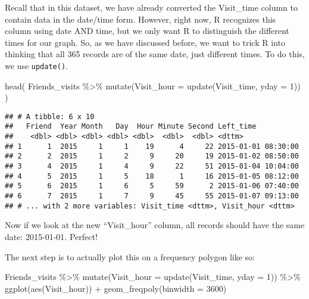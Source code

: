 \documentclass[
]{book}
\newenvironment{Shaded}{\begin{snugshade}}{\end{snugshade}}
\newcommand{\AttributeTok}[1]{\textcolor[rgb]{0.77,0.63,0.00}{#1}}
\newcommand{\DecValTok}[1]{\textcolor[rgb]{0.00,0.00,0.81}{#1}}
\newcommand{\FunctionTok}[1]{\textcolor[rgb]{0.00,0.00,0.00}{#1}}
\newcommand{\NormalTok}[1]{#1}
\newcommand{\SpecialCharTok}[1]{\textcolor[rgb]{0.00,0.00,0.00}{#1}}
\begin{document}
Recall that in this dataset, we have already converted the Visit\_time column to contain data in the date/time form. However, right now, R recognizes this column using date AND time, but we only want R to distinguish the different times for our graph. So, as we have discussed before, we want to trick R into thinking that all 365 records are of the same date, just different times. To do this, we use \texttt{update()}.

\begin{Shaded}
\begin{Highlighting}[]
\FunctionTok{head}\NormalTok{(}
\NormalTok{    Friends\_visits }\SpecialCharTok{\%\textgreater{}\%}
    \FunctionTok{mutate}\NormalTok{(}\AttributeTok{Visit\_hour =} \FunctionTok{update}\NormalTok{(Visit\_time, }\AttributeTok{yday =} \DecValTok{1}\NormalTok{))}
\NormalTok{    )}
\end{Highlighting}
\end{Shaded}

\begin{verbatim}
## # A tibble: 6 x 10
##   Friend  Year Month   Day  Hour Minute Second Left_time
##    <dbl> <dbl> <dbl> <dbl> <dbl>  <dbl>  <dbl> <dttm>
## 1      1  2015     1     1    19      4     22 2015-01-01 08:30:00
## 2      2  2015     1     2     9     20     19 2015-01-02 08:50:00
## 3      4  2015     1     4     9     22     51 2015-01-04 10:04:00
## 4      5  2015     1     5    18      1     16 2015-01-05 08:12:00
## 5      6  2015     1     6     5     59      2 2015-01-06 07:40:00
## 6      7  2015     1     7     9     45     55 2015-01-07 09:13:00
## # ... with 2 more variables: Visit_time <dttm>, Visit_hour <dttm>
\end{verbatim}

Now if we look at the new ``Visit\_hour'' column, all records should have the same date: 2015-01-01. Perfect!

The next step is to actually plot this on a frequency polygon like so:

\begin{Shaded}
\begin{Highlighting}[]
\NormalTok{ Friends\_visits }\SpecialCharTok{\%\textgreater{}\%}
    \FunctionTok{mutate}\NormalTok{(}\AttributeTok{Visit\_hour =} \FunctionTok{update}\NormalTok{(Visit\_time, }\AttributeTok{yday =} \DecValTok{1}\NormalTok{)) }\SpecialCharTok{\%\textgreater{}\%}
    \FunctionTok{ggplot}\NormalTok{(}\FunctionTok{aes}\NormalTok{(Visit\_hour)) }\SpecialCharTok{+}
    \FunctionTok{geom\_freqpoly}\NormalTok{(}\AttributeTok{binwidth =} \DecValTok{3600}\NormalTok{)}
\end{Highlighting}
\end{Shaded}
\end{document}

